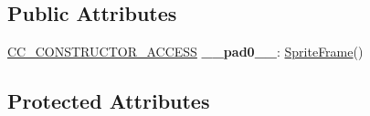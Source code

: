 \subsection*{Public Attributes}
\begin{DoxyCompactItemize}
\item 
\mbox{\label{classSpriteFrame_ad31d6d12e46504e65fe7d72e5aa6ac6e}} 
\hyperlink{_2cocos2d_2cocos_2base_2ccConfig_8h_a25ef1314f97c35a2ed3d029b0ead6da0}{C\+C\+\_\+\+C\+O\+N\+S\+T\+R\+U\+C\+T\+O\+R\+\_\+\+A\+C\+C\+E\+SS} {\bfseries \+\_\+\+\_\+pad0\+\_\+\+\_\+}\+: \hyperlink{classSpriteFrame}{Sprite\+Frame}()
\end{DoxyCompactItemize}
\subsection*{Protected Attributes}
